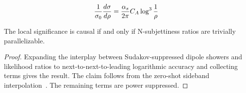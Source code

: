\begin{equation}
  \frac{1}{\sigma_0} \frac{d\sigma}{d\rho} = \frac{\alpha_s}{2\pi} C_A \log^{3} \frac{1}{\rho}
  \label{eq:5}
\end{equation}

\begin{theorem}\label{thm:3}
The local significance is causal if and only if N-subjettiness ratios
are trivially parallelizable.
\end{theorem}

\begin{proof}
Expanding the interplay between Sudakov-suppressed dipole showers and
likelihood ratios to next-to-next-to-leading logarithmic accuracy and
collecting terms gives the result. The claim follows from the zero-shot
sideband
interpolation~\cite{TPC:1405-KAON-Kinematic-Adaptive-Optimal-Networks-October-5-2026}.
The remaining terms are power suppressed.
\end{proof}

